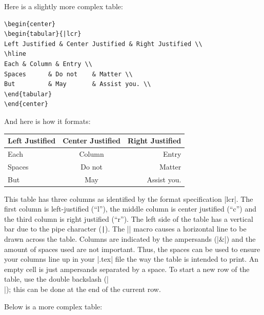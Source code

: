 Here is a slightly more complex table:

\begin{Verbatim}
\begin{center}
\begin{tabular}{|lcr}
Left Justified & Center Justified & Right Justified \\
\hline
Each & Column & Entry \\
Spaces      & Do not    & Matter \\
But         & May       & Assist you. \\
\end{tabular}
\end{center}
\end{Verbatim}

And here is how it formats:

\begin{center}
\begin{tabular}{|lcr}
Left Justified & Center Justified & Right Justified \\
\hline
Each & Column & Entry \\
Spaces      & Do not    & Matter \\
But         & May       & Assist you. \\
\end{tabular}
\end{center}

This table has three columns as identified by the format specification |lcr|.
The first column is left-justified (``l''), the middle column is center
justified (``c'') and the third column is right justified (``r''). The left
side of the table has a vertical bar due to the pipe character (\verb+|+).  The
|\hline| macro causes a horizontal line to be drawn across the table.  Columns
are indicated by the ampersands (|&|) and the amount of spaces used are not
important.  Thus, the spaces can be used to ensure your columns line up in your
|.tex| file the way the table is intended to print.  An empty cell is just
ampersands separated by a space.  To start a new row of the table, use the
double backslash (|\\|); this can be done at the end of the current row.

Below is a more complex table:


